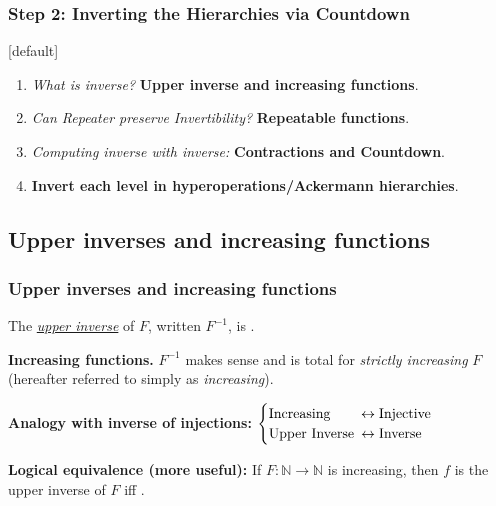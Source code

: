 \begin{frame}
\frametitle{Step 2: Inverting the Hierarchies via \textbf{Countdown}}
[default]

\begin{enumerate}[\bfseries 1.]
	\itemsep 3ex
	\pause
	\item<come@6->
	\emph{What is inverse?} \textbf{Upper inverse and increasing functions}.
	
	\item<3->
	\emph{Can Repeater preserve Invertibility?} \textbf{Repeatable functions}.
	
	\item<4->
	\emph{Computing inverse with inverse:} \textbf{Contractions and Countdown}.
	
	\item<5->
	\textbf{Invert each level in hyperoperations/Ackermann hierarchies}.
\end{enumerate}
\end{frame}


\subsection{Upper inverses and increasing functions}

\begin{frame}
\frametitle{Upper inverses and increasing functions}
The \href{https://github.com/inv-ack/inv-ack/blob/7270e64a2600b771f2b1b1b151f7d13fb2ae6c97/inverse.v\#L28-L45}{
	\emph{upper inverse}} of $F$, written $F^{-1}$,
is .


\bigskip

\pause 
\textbf{Increasing functions.} $F^{-1}$ makes sense and is total for \emph{strictly increasing} $F$ (hereafter referred to simply as \emph{increasing}).

\bigskip

\pause 
\textbf{Analogy with inverse of injections:} $\begin{cases}
\text{Increasing} & \hspace{-0.5em}\leftrightarrow \text{Injective} \\
\text{Upper Inverse} & \hspace{-0.5em}\leftrightarrow \text{Inverse}
\end{cases}$

\bigskip

\pause 
\textbf{Logical equivalence (more useful):}
\href{https://github.com/inv-ack/inv-ack/blob/7270e64a2600b771f2b1b1b151f7d13fb2ae6c97/inverse.v\#L65-L77}{\coq} If $F:\mathbb{N}\to \mathbb{N}$ is increasing, then $f$ is the upper inverse of $F$ iff .

\end{frame}

